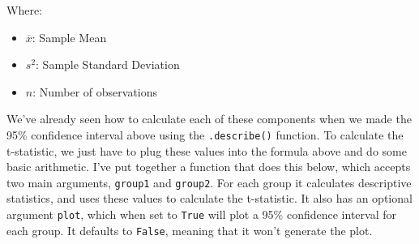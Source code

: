 \documentclass[
  letterpaper,
  DIV=11,
  numbers=noendperiod]{scrreprt}
\providecommand{\tightlist}{%
  \setlength{\itemsep}{0pt}\setlength{\parskip}{0pt}}\usepackage{longtable,booktabs,array}
\begin{document}
Where:

\begin{itemize}
\tightlist
\item
  \(\overline{x}\): Sample Mean
\item
  \(s^2\): Sample Standard Deviation
\item
  \(n\): Number of observations
\end{itemize}

We've already seen how to calculate each of these components when we
made the 95\% confidence interval above using the \texttt{.describe()}
function. To calculate the t-statistic, we just have to plug these
values into the formula above and do some basic arithmetic. I've put
together a function that does this below, which accepts two main
arguments, \texttt{group1} and \texttt{group2}. For each group it
calculates descriptive statistics, and uses these values to calculate
the t-statistic. It also has an optional argument \texttt{plot}, which
when set to \texttt{True} will plot a 95\% confidence interval for each
group. It defaults to \texttt{False}, meaning that it won't generate the
plot.
\end{document}
